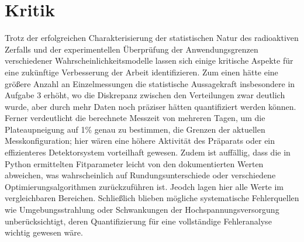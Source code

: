 \section{Kritik} \label{sec:Kritik}

Trotz der erfolgreichen Charakterisierung der statistischen Natur des radioaktiven Zerfalls und der experimentellen Überprüfung der Anwendungsgrenzen verschiedener Wahrscheinlichkeitsmodelle lassen sich einige kritische Aspekte für eine zukünftige Verbesserung der Arbeit identifizieren. Zum einen hätte eine größere Anzahl an Einzelmessungen die statistische Aussagekraft insbesondere in Aufgabe 3 erhöht, wo die Diskrepanz zwischen den Verteilungen zwar deutlich wurde, aber durch mehr Daten noch präziser hätten quantifiziert werden können. Ferner verdeutlicht die berechnete Messzeit von mehreren Tagen, um die Plateaupneigung auf 1\% genau zu bestimmen, die Grenzen der aktuellen Messkonfiguration; hier wären eine höhere Aktivität des Präparats oder ein effizienteres Detektorsystem vorteilhaft gewesen. Zudem ist auffällig, dass die in Python ermittelten Fitparameter leicht von den dokumentierten Werten abweichen, was wahrscheinlich auf Rundungsunterschiede oder verschiedene Optimierungsalgorithmen zurückzuführen ist. Jeodch lagen hier alle Werte im vergleichbaren Bereichen. Schließlich blieben mögliche systematische Fehlerquellen wie Umgebungsstrahlung oder Schwankungen der Hochspannungsversorgung unberücksichtigt, deren Quantifizierung für eine vollständige Fehleranalyse wichtig gewesen wäre.